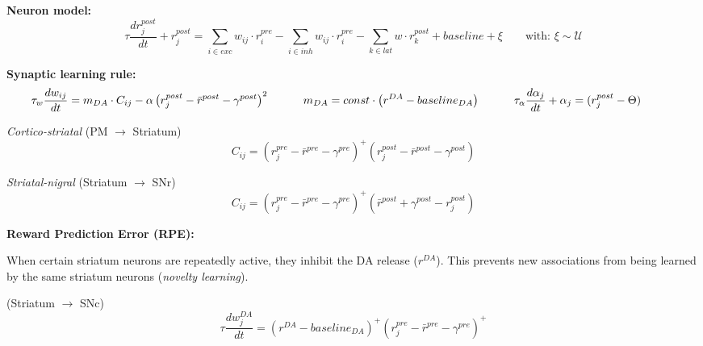 \textbf{Neuron model:}\\[2pt]
$$
\tau \frac{d r^{post}_j }{ dt } + r^{post}_j = \sum_{i \in exc}{w_{ij} \cdot r^{pre}_i} - \sum_{i \in inh}{w_{ij} \cdot r^{pre}_i} - \sum_{k \in lat}{w \cdot r^{post}_k} + baseline + \xi \hspace{2em} \text{with:  } \xi \sim \mathcal{U}
$$

\textbf{Synaptic learning rule:}\\
$$\tau_w \frac{d w_{ij} }{ dt } = m_{DA} \cdot C_{ij} - \alpha \left(r^{post}_j - \bar{r}^{post} - \gamma^{post}\right)^2 \hspace{3em}
m_{DA} = const \cdot \left(r^{DA} - baseline_{DA}\right) \hspace{3em} \tau_{\alpha} \frac{d \alpha_j }{ dt } + \alpha_j = (r^{post}_j - \Theta) \hspace{3em} \vspace{1em}$$
\vspace{1em}
\begin{minipage}[t]{0.5\textwidth}
	\centering
	\textit{Cortico-striatal} (PM $\rightarrow$ Striatum)
	$$ C_{ij} = \left(r^{pre}_j - \bar{r}^{pre} - \gamma^{pre}\right)^+ \left(r^{post}_j - \bar{r}^{post} - \gamma^{post}\right) $$	
\end{minipage}
\begin{minipage}[t]{0.5\textwidth}
	\centering
	\textit{Striatal-nigral} (Striatum $\rightarrow$ SNr)
	$$ C_{ij} = \left(r^{pre}_j - \bar{r}^{pre} - \gamma^{pre}\right)^+ \left(\bar{r}^{post} + \gamma^{post} - r^{post}_j \right) $$
\end{minipage}

\textbf{Reward Prediction Error (RPE):}\\[5pt]
\begin{minipage}[t]{0.45\textwidth}
	When certain striatum neurons are repeatedly active, they inhibit the DA release ($r^{DA}$). 
	This prevents new associations from being learned by the same striatum neurons (\textit{novelty learning}).\\
\end{minipage}
\hfill
\begin{minipage}[t]{0.5\textwidth}
	\centering
(Striatum $\rightarrow$ SNc)
$$ \tau \frac{d w_{j}^{DA}}{dt} =  \left(r^{DA} - baseline_{DA}\right)^+ \left( r^{pre}_j - \bar{r}^{pre} - \gamma^{pre}\right)^+ $$
\end{minipage}




